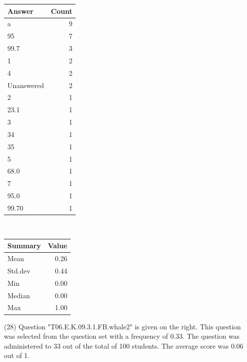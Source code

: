\documentclass[12pt,nohyper]{tufte-handout}\usepackage[]{graphicx}\usepackage[]{color}
\begin{document}
\begin{center}%
\begin{tabular}{lr}
  \hline
Answer & Count \\ 
  \hline
a &   9 \\ 
  95 &   7 \\ 
  99.7 &   3 \\ 
  1 &   2 \\ 
  4 &   2 \\ 
  Unanswered &   2 \\ 
  2 &   1 \\ 
  23.1 &   1 \\ 
  3 &   1 \\ 
  34 &   1 \\ 
  35 &   1 \\ 
  5 &   1 \\ 
  68.0 &   1 \\ 
  7 &   1 \\ 
  95.0 &   1 \\ 
  99.70 &   1 \\ 
   \hline
\end{tabular}
~~~~~~~~%
\begin{tabular}{lr}
  \hline
Summary & Value \\ 
  \hline
Mean & 0.26 \\ 
  Std.dev & 0.44 \\ 
  Min & 0.00 \\ 
  Median & 0.00 \\ 
  Max & 1.00 \\ 
   \hline
\end{tabular}
\end{center}\newpage{} (28) Question "T06.E.K.09.3.1.FB.whale2" is given on the right. This question was selected from the question set with a frequency of 0.33. The question was administered to 33 out of the total of 100 students. The average score was 0.06 out of 1.
\end{document}
